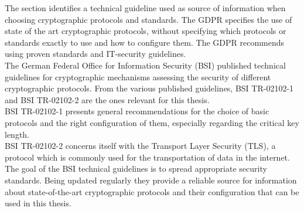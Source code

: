 The section \textit{} identifies a technical guideline used as source of information when choosing cryptographic protocols and standards. The GDPR specifies the use of state of the art cryptographic protocols, without specifying which protocols or standards exactly to use and how to configure them. The GDPR recommends using proven standards and IT-security guidelines.
\\
The German Federal Office for Information Security (BSI) published technical guidelines\cite{bsitr} for cryptographic mechanisms assessing the security of different cryptographic protocols. From the various published guidelines, BSI TR-02102-1\cite{bsitr01} and BSI TR-02102-2\cite{bsitr02} are the ones relevant for this thesis. 
\\
BSI TR-02102-1 presents general recommendations for the choice of basic protocols and the right configuration of them, especially regarding the critical key length. 
\\
BSI TR-02102-2 concerns itself with the Transport Layer Security (TLS), a protocol which is commonly used for the transportation of data in the internet.
\\
The goal of the BSI technical guidelines is to spread appropriate security standards. Being updated regularly they provide a reliable source for information about state-of-the-art cryptographic protocols and their configuration that can be used in this thesis.
\\
